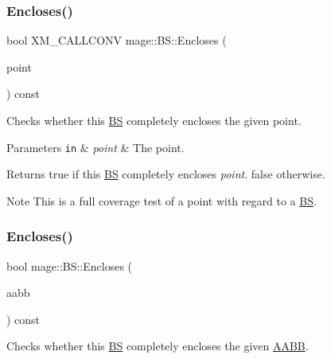 \subsubsection{\texorpdfstring{Encloses()}{Encloses()}\hspace{0.1cm}{\footnotesize\ttfamily [2/4]}}
{\footnotesize\ttfamily bool X\+M\+\_\+\+C\+A\+L\+L\+C\+O\+NV mage\+::\+B\+S\+::\+Encloses (\begin{DoxyParamCaption}\item[{F\+X\+M\+V\+E\+C\+T\+OR}]{point }\end{DoxyParamCaption}) const\hspace{0.3cm}{\ttfamily [noexcept]}}

Checks whether this \hyperlink{classmage_1_1_b_s}{BS} completely encloses the given point.


\begin{DoxyParams}[1]{Parameters}
\mbox{\tt in}  & {\em point} & The point. \\
\hline
\end{DoxyParams}
\begin{DoxyReturn}{Returns}
{\ttfamily true} if this \hyperlink{classmage_1_1_b_s}{BS} completely encloses {\itshape point}. {\ttfamily false} otherwise. 
\end{DoxyReturn}
\begin{DoxyNote}{Note}
This is a full coverage test of a point with regard to a \hyperlink{classmage_1_1_b_s}{BS}. 
\end{DoxyNote}
\hypertarget{classmage_1_1_b_s_ac646d715cc59c4ac7c324696fbf00ba8}{}\label{classmage_1_1_b_s_ac646d715cc59c4ac7c324696fbf00ba8} 
\subsubsection{\texorpdfstring{Encloses()}{Encloses()}\hspace{0.1cm}{\footnotesize\ttfamily [3/4]}}
{\footnotesize\ttfamily bool mage\+::\+B\+S\+::\+Encloses (\begin{DoxyParamCaption}\item[{const \hyperlink{classmage_1_1_a_a_b_b}{A\+A\+BB} \&}]{aabb }\end{DoxyParamCaption}) const\hspace{0.3cm}{\ttfamily [noexcept]}}

Checks whether this \hyperlink{classmage_1_1_b_s}{BS} completely encloses the given \hyperlink{classmage_1_1_a_a_b_b}{A\+A\+BB}.


